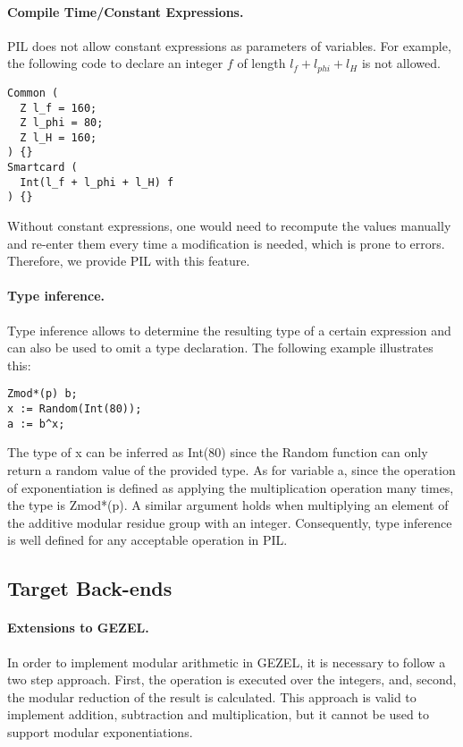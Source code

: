 \paragraph{Compile Time/Constant Expressions.} PIL does not allow
constant expressions as parameters of variables. For example, the following code to declare an integer $f$ of length $l_f + l_{phi} + l_H$ is not allowed.
\begin{lstlisting}[language=PIL]
Common (
  Z l_f = 160;
  Z l_phi = 80;
  Z l_H = 160;
) {}
Smartcard (
  Int(l_f + l_phi + l_H) f
) {}
\end{lstlisting}
Without constant expressions, one would need to recompute the values
manually and re-enter them every time a modification is needed, which is prone to errors. Therefore, we provide PIL with this feature.

\paragraph{Type inference.}
Type inference allows to determine the resulting
type of a certain expression and can also be used to omit
a type declaration. The following example illustrates this:
\begin{lstlisting}[language=PIL]
Zmod*(p) b;
x := Random(Int(80));
a := b^x;
\end{lstlisting}
The type of x can be inferred as Int(80) since
the Random function can only return a random value of the provided
type. As for variable a, since the operation of exponentiation is defined as
applying the multiplication operation many times, the type is Zmod*(p). A similar argument holds when multiplying an element
of the additive modular residue group with an integer. Consequently,
type inference is well defined for any acceptable operation in PIL.

\subsection{Target Back-ends}
\label{targetbackends}
\paragraph{Extensions to GEZEL.}
\label{extensionsGEZEL}

In order to implement modular arithmetic in GEZEL, it is necessary to
follow a two step approach. First, the operation is executed over the
integers, and, second, the modular reduction of the result is
calculated. This approach is valid to implement addition, subtraction
and multiplication, but it cannot be used to support modular
exponentiations.

